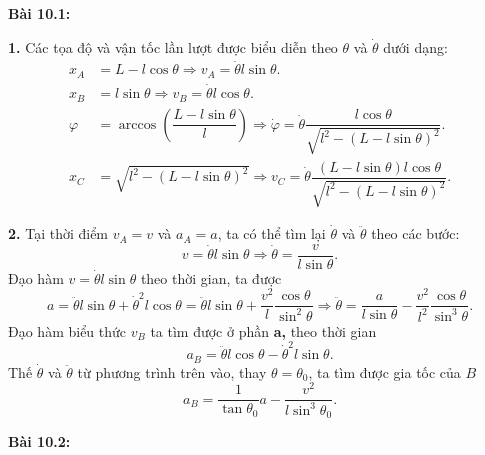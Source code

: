 \textbf{Bài 10.1:} 

\textbf{1.} Các tọa độ và vận tốc lần lượt được biểu diễn theo $\theta$ và $\dot{\theta}$ dưới dạng:
\begin{align*}
    x_A &= L - l \cos \theta \Rightarrow v_A= \dot{\theta} l \sin \theta. \\
    x_B &= l \sin \theta \Rightarrow v_B = \dot{\theta} l \cos \theta. \\
    \varphi &= \arccos \left( \dfrac{L - l \sin \theta}{l} \right) \Rightarrow \dot{\varphi} = \dot{\theta} \dfrac{l \cos \theta}{\sqrt{l^2 - \left( L - l \sin \theta \right)^2}}. \\
    x_C &= \sqrt{l^2 - \left( L - l \sin \theta \right)^2} \Rightarrow v_C = \dot{\theta} \dfrac{(L-l \sin \theta) l \cos \theta}{\sqrt{l^2 - \left( L - l \sin \theta \right)^2}}.
\end{align*}

\textbf{2.} Tại thời điểm \(v_A=v\) và \(a_A=a\), ta có thể tìm lại \(\dot{\theta}\) và \(\ddot{\theta}\) theo các bước:
\begin{equation} \label{eq1_rectangle_collision}
    v=\dot{\theta} l \sin \theta \Rightarrow \dot{\theta}= \dfrac{v}{l \sin \theta}.
\end{equation}
Đạo hàm $v=\dot{\theta} l \sin \theta$ theo thời gian, ta được
\begin{equation} \label{eq2_rectangle_collision}
    a = \ddot{\theta} l \sin \theta + \dot{\theta}^2 l \cos \theta = \ddot{\theta} l \sin \theta + \dfrac{v^2}{l} \dfrac{\cos \theta}{\sin^2 \theta} \Rightarrow \ddot{\theta}= \dfrac{a}{l \sin \theta} - \dfrac{v^2}{l^2} \dfrac{\cos \theta}{\sin^3 \theta}.
\end{equation}
Đạo hàm biểu thức $v_B$ ta tìm được ở phần \textbf{a,} theo thời gian
\begin{equation} \label{eq3_rectangle_collision}
    a_B = \ddot{\theta} l \cos \theta - \dot{\theta}^2 l \sin \theta.
\end{equation}
Thế $\dot{\theta}$ và $\ddot{\theta}$ từ phương trình trên vào, thay $\theta=\theta_0$, ta tìm được gia tốc của $B$
\begin{equation} \label{eq4_rectangle_collision}
    a_B = \dfrac{1}{\tan \theta_0} a - \dfrac{v^2}{l \sin^3 \theta_0}.
\end{equation}


\textbf{Bài 10.2:}


\begin{refsection}
\nocite{dao2002cohocgiaitich,tuan2019kinematic,craig2011introduction}
\printbibliography
\end{refsection}